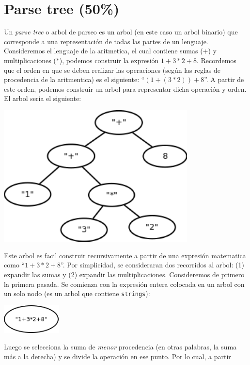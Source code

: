 \documentclass{article}
\begin{document}
\section*{Parse tree (50\%)}
Un \emph{parse tree} o arbol de parseo es un arbol (en este caso un arbol binario) que corresponde a una
representaci\'on de todas las partes de un lenguaje. Consideremos el lenguaje de la aritmetica, el
cual contiene sumas ($+$) y multiplicaciones ($*$), podemos construir la expresi\'on $1+3*2+8$. Recordemos
que el orden en que se deben realizar las operaciones (seg\'un las reglas de procedencia de la aritmentica)
es el siguiente: ``$(1+(3*2))+8$''. A partir de este orden, podemos construir un arbol para representar dicha
operaci\'on y orden. El arbol seria el siguiente:
\\
\begin{center}
\includegraphics[width=10cm]{pTree.png}
\end{center}
Este arbol es facil construir recursivamente a partir de una expresi\'on matematica
como ``$1+3*2+8$''. Por simplicidad, se consideraran dos recorridos al arbol: (1)
expandir las sumas y (2) expandir las multiplicaciones. Consideremos de primero la
primera pasada. Se comienza con la expresi\'on entera colocada en un arbol con un
solo nodo (es un arbol que contiene \texttt{strings}):
\\
\begin{center}
        \includegraphics[width=3cm]{1ptree.png}
\end{center}
Luego se selecciona la suma de \emph{menor} procedencia (en otras palabras, la suma
m\'as a la derecha) y se divide la operaci\'on en ese punto. Por lo cual, a partir
\end{document}
